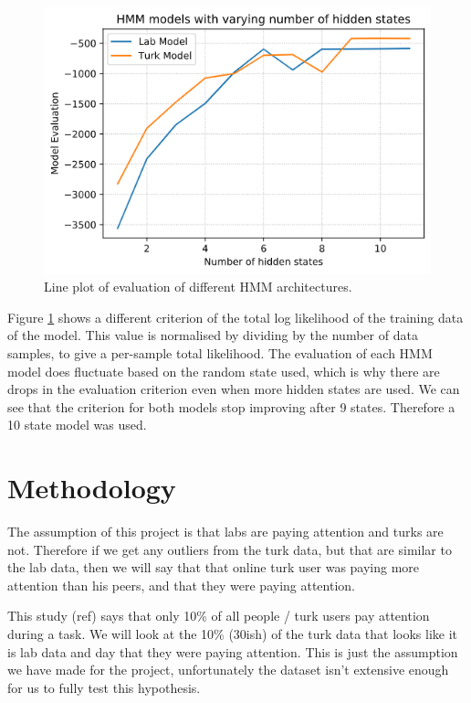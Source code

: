 \documentclass{article}
\begin{document}
\begin{figure}[ht]
    \centering
    \includegraphics[scale=0.55]{Images/ModelEvaluation.png}
    \caption{Line plot of evaluation of different HMM architectures.}
    \label{fig:ModleEval}
\end{figure}

Figure \ref{fig:ModleEval} shows a different criterion of the total log likelihood of the training data of the model.
This value is normalised by dividing by the number of data samples, to give a per-sample total likelihood.
The evaluation of each HMM model does fluctuate based on the random state used, which is why there are drops in the evaluation criterion even when more hidden states are used.
We can see that the criterion for both models stop improving after 9 states.
Therefore a 10 state model was used.


\section{Methodology}

 The assumption of this project is that labs are paying attention and turks are not. Therefore if we get any outliers from the turk data, but that are similar to the lab data, then we will say that that online turk user was paying more attention than his peers, and that they were paying attention.

This study (ref) says that only 10\% of all people / turk users pay attention during a task.
We will look at the 10\% (30ish) of the turk data that looks like it is lab data and day that they were paying attention.
This is just the assumption we have made for the project, 
unfortunately the dataset isn't extensive enough for us to fully test this hypothesis.
\end{document}
